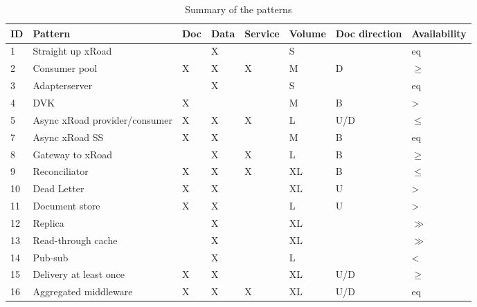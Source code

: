\documentclass[10pt,a4paper]{article}
\begin{document}
\begin{table}
	\begin{center}
		\begin{tabular}{p{.6cm}p{3.4cm}p{.8cm}p{.8cm}p{.8cm}p{.8cm}p{1.2cm}p{1.2cm}}
		\toprule
ID & Pattern & Doc & Data & Service & Volume & Doc direction & Availability \\
\midrule
1 & Straight up xRoad &  & X &  & S &   & eq \\
2 & Consumer pool & X & X & X & M & D & $\geq$ \\
3 & Adapterserver &  & X &  & S &   & eq \\
4 & DVK & X &  &  & M & B & > \\
5 & Async xRoad provider/consumer & X & X & X & L & U/D & $\leq$ \\
7 & Async xRoad SS & X & X &  & M & B & eq \\
8 & Gateway to xRoad &  & X & X & L &  B & $\geq$ \\
9 & Reconciliator & X & X & X & XL & B & $\leq$ \\
10 & Dead Letter & X & X &  & XL & U & > \\
11 & Document store & X & X &  & L & U & > \\
12 & Replica &  & X &  & XL &   & $\gg$ \\
13 & Read-through cache &  & X &  & XL &   & $\gg$ \\
14 & Pub-sub &  & X &  & L &  & < \\
15 & Delivery at least once & X & X & & XL & U/D & $\geq$ \\
16 & Aggregated middleware & X & X & X & XL & U/D & eq \\
\bottomrule
		\end{tabular}
		\caption{Summary of the patterns}
		\label{tab:dir}
	\end{center}
\end{table}
\end{document}
